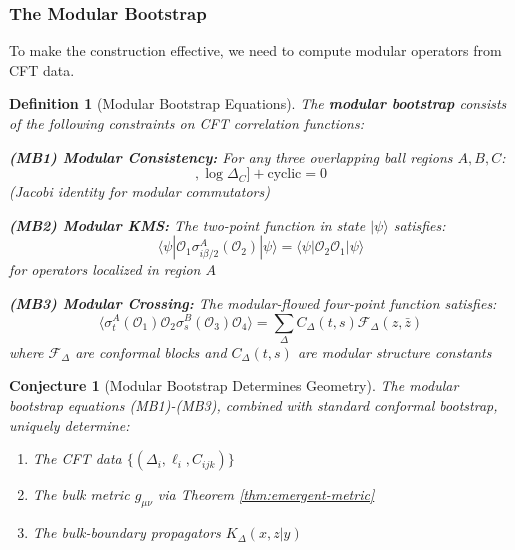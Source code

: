 \documentclass[12pt,a4paper]{article}
\newtheorem{conjecture}[theorem]{Conjecture}
\newtheorem{definition}[theorem]{Definition}
\begin{document}
\subsubsection{The Modular Bootstrap}

To make the construction effective, we need to compute modular operators from CFT data.

\begin{definition}[Modular Bootstrap Equations]\label{def:modular-bootstrap}
The \textbf{modular bootstrap} consists of the following constraints on CFT correlation functions:

\textbf{(MB1) Modular Consistency:} For any three overlapping ball regions $A, B, C$:
\begin{equation}
[[\log\Delta_A, \log\Delta_B], \log\Delta_C] + \text{cyclic} = 0
\end{equation}
(Jacobi identity for modular commutators)

\textbf{(MB2) Modular KMS:} The two-point function in state $|\psi\rangle$ satisfies:
\begin{equation}
\langle \psi | \mathcal{O}_1 \sigma^A_{i\beta/2}(\mathcal{O}_2) | \psi \rangle = \langle \psi | \mathcal{O}_2 \mathcal{O}_1 | \psi \rangle
\end{equation}
for operators localized in region $A$

\textbf{(MB3) Modular Crossing:} The modular-flowed four-point function satisfies:
\begin{equation}
\langle \sigma^A_t(\mathcal{O}_1) \mathcal{O}_2 \sigma^B_s(\mathcal{O}_3) \mathcal{O}_4 \rangle = \sum_\Delta C_\Delta(t,s) \mathcal{F}_\Delta(z, \bar{z})
\end{equation}
where $\mathcal{F}_\Delta$ are conformal blocks and $C_\Delta(t,s)$ are modular structure constants
\end{definition}

\begin{conjecture}[Modular Bootstrap Determines Geometry]
The modular bootstrap equations (MB1)-(MB3), combined with standard conformal bootstrap, uniquely determine:
\begin{enumerate}
    \item The CFT data $\{(\Delta_i, \ell_i, C_{ijk})\}$
    \item The bulk metric $g_{\mu\nu}$ via Theorem \ref{thm:emergent-metric}
    \item The bulk-boundary propagators $K_\Delta(x,z|y)$
\end{enumerate}
\end{conjecture}
\end{document}
